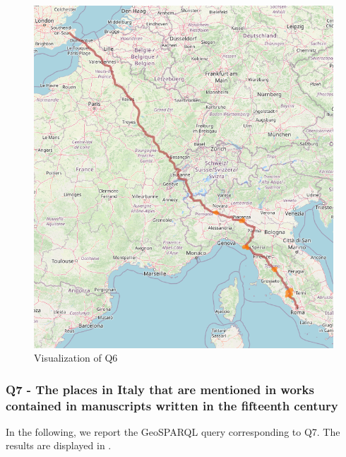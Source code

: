 \begin{figure}[h!tb]
    \centerline {\includegraphics[scale=0.6]{img/francigena.png}}
    \caption{Visualization of Q6}
    \label{fig:francigena}
\end{figure}

\subsubsection*{Q7 - The places in Italy that are mentioned in works contained in manuscripts written in the fifteenth century }
In the following, we report the GeoSPARQL query corresponding to Q7. The results are displayed in .


